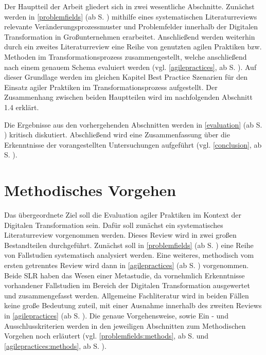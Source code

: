 Der Hauptteil der Arbeit gliedert sich in zwei wesentliche Abschnitte. Zunächst werden in \ref{problemfields} (ab S. \pageref{problemfields}) mithilfe eines systematischen Literaturreviews relevante Veränderungsprozessmuster und Problemfelder innerhalb der Digitalen Transformation in Großunternehmen erarbeitet. Anschließend werden weiterhin durch ein zweites Literaturreview eine Reihe von genutzten agilen Praktiken bzw. Methoden im Transformationsprozess zusammengestellt, welche anschließend nach einem genauem Schema evaluiert werden (vgl. \ref{agilepractices}, ab S. \pageref{agilepractices}). Auf dieser Grundlage werden im gleichen Kapitel Best Practice Szenarien für den Einsatz agiler Praktiken im Transformationsprozess aufgestellt. Der Zusammenhang zwischen beiden Hauptteilen wird im nachfolgenden Abschnitt 1.4 erklärt.

Die Ergebnisse aus den vorhergehenden Abschnitten werden in \ref{evaluation} (ab S. \pageref{evaluation}) kritisch diskutiert. Abschließend wird eine Zusammenfassung über die Erkenntnisse der vorangestellten Untersuchungen aufgeführt (vgl. \ref{conclusion}, ab S. \pageref{conclusion}).


\section{Methodisches Vorgehen}
\label{introduction:methods}


Das übergeordnete Ziel soll die Evaluation agiler Praktiken im Kontext der Digitalen Transformation sein. Dafür soll zunächst ein systematisches Literaturreview vorgenommen werden. Dieses Review wird in zwei großen Bestandteilen durchgeführt. Zunächst soll in \ref{problemfields} (ab S. \pageref{problemfields}) eine Reihe von Fallstudien systematisch analysiert werden. Eine weiteres, methodisch vom ersten getrenntes  Review wird dann in \ref{agilepractices} (ab S. \pageref{agilepractices}) vorgenommen. Beide SLR haben das Wesen einer Metastudie, da vornehmlich Erkenntnisse vorhandener Fallstudien im Bereich der Digitalen Transformation ausgewertet und zusammengefasst werden. Allgemeine Fachliteratur wird in beiden Fällen keine große Bedeutung zuteil, mit einer  Ausnahme innerhalb des zweiten Reviews in \ref{agilepractices} (ab S. \pageref{agilepractices}). Die genaue Vorgehensweise, sowie Ein - und Ausschlusskriterien werden in den jeweiligen Abschnitten zum Methodischen Vorgehen noch erläutert (vgl. \ref{problemfields:methods}, ab S. \pageref{problemfields:methods} und \ref{agilepractices:methods}, ab S. \pageref{agilepractices:methods}).

